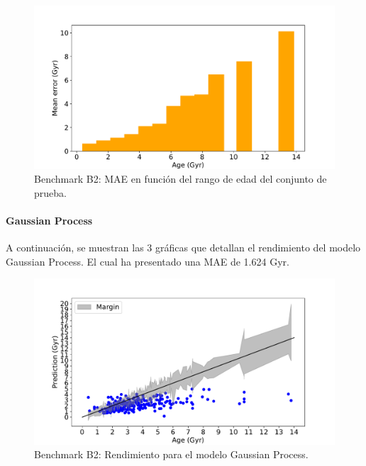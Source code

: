 \begin{figure}[H]
\begin{center}
 \includegraphics[width=0.8\linewidth]{Figuras/Experimentos/B_B2_nnet_3.pdf}
\end{center}
\caption{Benchmark B2: MAE en función del rango de edad del conjunto de prueba.}
 \label{fig:benchB2_details_nnet_3}
\end{figure}

\paragraph{Gaussian Process} 
A continuación, se muestran las 3 gráficas que detallan el rendimiento del modelo Gaussian Process. El cual ha presentado una MAE de 1.624 Gyr.
\begin{figure}[H]
\begin{center}
 \includegraphics[width=0.8\linewidth]{Figuras/Experimentos/B_B2_gp_1.pdf}
\end{center}
\caption{Benchmark B2: Rendimiento para el modelo Gaussian Process.}
 \label{fig:benchB2_details_gp_1}
\end{figure}

